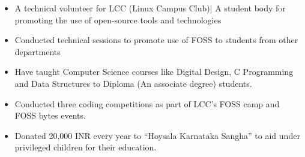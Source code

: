\documentclass[a4paper, 10pt]{extarticle}
\begin{document}
\begin{large}
\begin{itemize}
    \setlength\itemsep{0.05cm}
    \item{A technical volunteer for LCC (Linux Campus Club)| A student body for promoting the use of open-source tools and technologies}
   
    \item{Conducted technical sessions to promote use of FOSS to students from other departments }
    
    \item{Have taught Computer Science courses like Digital Design, C Programming and Data Structures to Diploma (An associate degree) students.}
    
    \item{Conducted three coding competitions as part of LCC's FOSS camp and FOSS bytes events.}
    
    \item{Donated 20,000 INR every year to ``Hoysala Karnataka Sangha'' to aid under privileged children for their education.}
    
\end{itemize}

\end{large}
\end{document}
